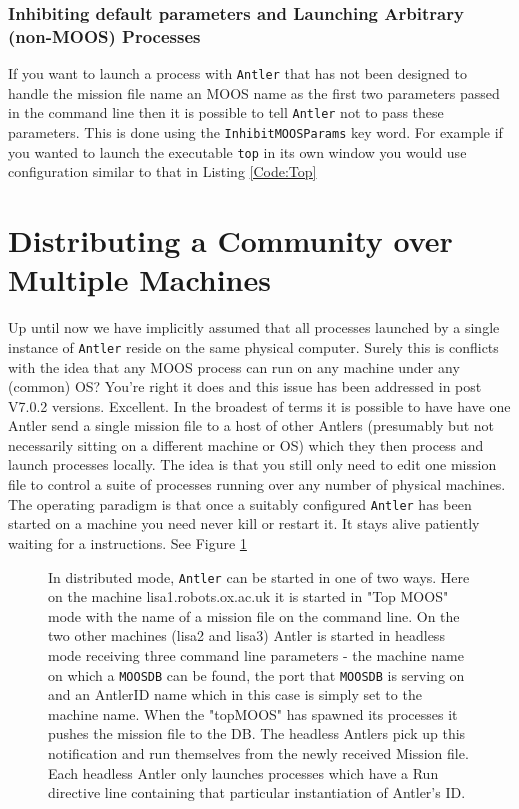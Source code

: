 \documentclass[a4paper,10pt]{article}
\newcommand{\Code}[1]{\texttt{#1} }
\newcommand{\code}[1]{\Code{#1} }
\begin{document}
\subsubsection{Inhibiting default parameters and Launching Arbitrary (non-MOOS) Processes}

If you want to launch a process with \code{Antler} that has not been designed to handle the mission file name an MOOS name as the first two parameters passed in the command line then it is possible to tell \code{Antler} not to pass these parameters. This is done using the \code{InhibitMOOSParams}  key word. For example if you wanted to launch the executable \code{top} in its own window you would use configuration similar to that in Listing \ref{Code:Top}


 


\section{Distributing  a Community over Multiple Machines}

Up until now we have implicitly assumed that all processes launched by a single instance of \code{Antler} reside on the same physical computer. Surely this is conflicts with the idea that any MOOS process can run on any machine under any (common) OS? You're right it does and this issue has been addressed in post V7.0.2 versions. Excellent. In the broadest of terms it is possible to have have one Antler send a single mission file to a host of other Antlers (presumably but not necessarily sitting on a different machine or OS) which they then process and launch processes locally. The idea is that you still only need to edit one mission file to control a suite of processes running over any number of physical machines. The operating paradigm is that once a suitably configured \code{Antler} has been started on a machine you need never kill or restart it. It stays alive patiently waiting for a instructions. See Figure \ref{Fig:Distributed}

\begin{figure}\label{Fig:Distributed}
\centering
{}
\caption{In distributed mode, \code{Antler} can be started in one of two ways. Here on the machine lisa1.robots.ox.ac.uk it is started  in "Top MOOS" mode with the name of a mission file on the command line. On the two other machines (lisa2 and lisa3) Antler is started in headless mode receiving three command line parameters - the machine name on which a \code{MOOSDB} can be found, the port that \code{MOOSDB} is serving on and an AntlerID name which in this case is simply set to the machine name. When the "topMOOS" has spawned its processes it pushes the mission file to the DB. The headless Antlers pick up this notification and run themselves from the newly received Mission file. Each headless Antler  only launches processes which have a Run directive line containing that particular instantiation of Antler's ID.} 
\end{figure}
\end{document}
